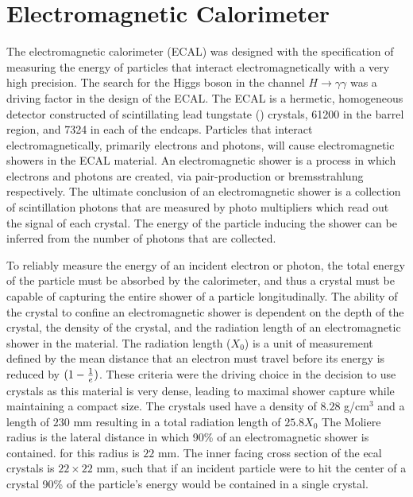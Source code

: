\section{Electromagnetic Calorimeter}
\label{sec:ecal}
The electromagnetic calorimeter (ECAL) was designed with the specification of measuring the energy of particles that interact electromagnetically with a very high precision. 
The search for the Higgs boson in the channel $H\rightarrow\gamma\gamma$ was a driving factor in the design of the ECAL.
The ECAL is a hermetic, homogeneous detector constructed of scintillating lead tungstate () crystals, 61200 in the barrel region, and 7324 in each of the endcaps.
Particles that interact electromagnetically, primarily electrons and photons, will cause electromagnetic showers in the ECAL material.
An electromagnetic shower is a process in which electrons and photons are created, via pair-production or bremsstrahlung respectively.
The ultimate conclusion of an electromagnetic shower is a collection of scintillation photons that are measured by photo multipliers which read out the signal of each crystal. %
The energy of the particle inducing the shower can be inferred from the number of photons that are collected.

To reliably measure the energy of an incident electron or photon, the total energy of the particle must be absorbed by the calorimeter, and thus a crystal must be capable of capturing the entire shower of a particle longitudinally.
The ability of the crystal to confine an electromagnetic shower is dependent on the depth of the crystal, the density of the crystal, and the radiation length of an electromagnetic shower in the material.
The radiation length ($X_{0}$) is a unit of measurement defined by the mean distance that an electron must travel before its energy is reduced by $(1-{1\over e})$.
These criteria were the driving choice in the decision to use  crystals as this material is very dense, leading to maximal shower capture while maintaining a compact size.
The crystals used have a density of $8.28$ g/cm$^{3}$ and a length of $230$ mm resulting in a total radiation length of $25.8 X_{0}$
The Moliere radius is the lateral distance in which 90\% of an electromagnetic shower is contained. for  this radius is $22$ mm. 
The inner facing cross section of the ecal crystals is $22\times22$ mm, such that if an incident particle were to hit the center of a crystal 90\% of the particle's energy would be contained in a single crystal.


